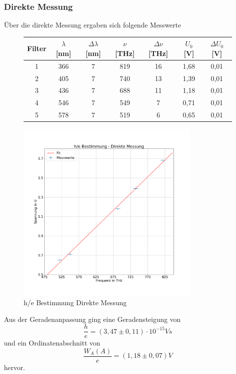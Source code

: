 \documentclass{scrartcl}
\begin{document}
		\subsubsection{Direkte Messung}
			Über die direkte Messung ergaben sich folgende Messwerte 
			\begin{figure}[H]
				\centering
				\begin{tabular}{|c|c|c|c|c|c|c|}
					\hline
					Filter & $\lambda$ [nm] & $\Delta\lambda$ [nm] & $\nu$ [THz] & $\Delta\nu$ [THz] & $U_0$ [V] & $\Delta U_0$ [V] \\
					\hline
					1 & 366 & 7 & 819 & 16 & 1,68 & 0,01\\
					2 & 405 & 7 & 740 & 13 & 1,39 & 0,01\\ 
					3 & 436 & 7 & 688 & 11 & 1,18 & 0,01\\
					4 & 546 & 7 & 549 & 7 & 0,71 & 0,01\\
					5 & 578 & 7 & 519 & 6 & 0,65 & 0,01\\
					\hline
				\end{tabular}
			\end{figure}
			\begin{figure}[H]
				\centering
				\includegraphics[width=0.8\textwidth]{he_direkt.png}
				\caption{h/e Bestimmung Direkte Messung}
			\end{figure}
			Aus der Geradenanpassung ging eine Geradensteigung von 
			\begin{equation}
				\frac{h}{e}= (3,47\pm 0,11)\cdot 10^{-15}V s
			\end{equation}
			und ein Ordinatenabschnitt von
			\begin{equation}
				\frac{W_A(A)}{e} = (1,18\pm 0,07)V
			\end{equation}
			hervor.
\end{document}
